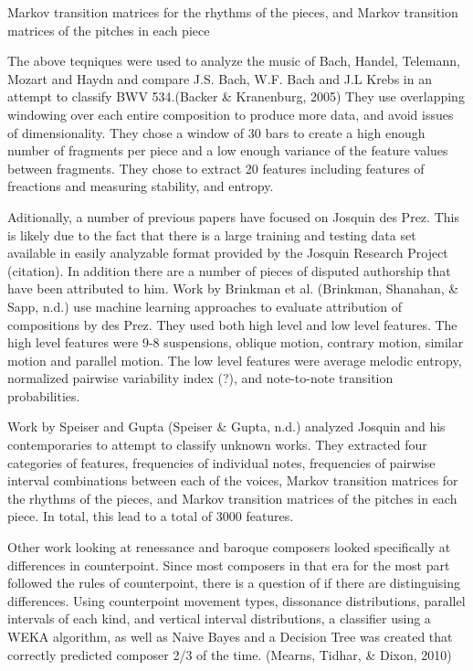 \documentclass[12pt,twoside]{reedthesis}
\theoremstyle{definition}
\theoremstyle{definition}
\theoremstyle{definition}
\theoremstyle{remark}
\begin{document}
Markov transition matrices for the rhythms of the pieces, and Markov
transition matrices of the pitches in each piece

The above teqniques were used to analyze the music of Bach, Handel,
Telemann, Mozart and Haydn and compare J.S. Bach, W.F. Bach and J.L
Krebs in an attempt to classify BWV 534.(Backer \& Kranenburg, 2005)
They use overlapping windowing over each entire composition to produce
more data, and avoid issues of dimensionality. They chose a window of 30
bars to create a high enough number of fragments per piece and a low
enough variance of the feature values between fragments. They chose to
extract 20 features including features of freactions and measuring
stability, and entropy.

Aditionally, a number of previous papers have focused on Josquin des
Prez. This is likely due to the fact that there is a large training and
testing data set available in easily analyzable format provided by the
Josquin Research Project (citation). In addition there are a number of
pieces of disputed authorship that have been attributed to him. Work by
Brinkman et al. (Brinkman, Shanahan, \& Sapp, n.d.) use machine learning
approaches to evaluate attribution of compositions by des Prez. They
used both high level and low level features. The high level features
were 9-8 suspensions, oblique motion, contrary motion, similar motion
and parallel motion. The low level features were average melodic
entropy, normalized pairwise variability index (?), and note-to-note
transition probabilities.

Work by Speiser and Gupta (Speiser \& Gupta, n.d.) analyzed Josquin and
his contemporaries to attempt to classify unknown works. They extracted
four categories of features, frequencies of individual notes,
frequencies of pairwise interval combinations between each of the
voices, Markov transition matrices for the rhythms of the pieces, and
Markov transition matrices of the pitches in each piece. In total, this
lead to a total of 3000 features.

Other work looking at renessance and baroque composers looked
specifically at differences in counterpoint. Since most composers in
that era for the most part followed the rules of counterpoint, there is
a question of if there are distinguising differences. Using counterpoint
movement types, dissonance distributions, parallel intervals of each
kind, and vertical interval distributions, a classifier using a WEKA
algorithm, as well as Naive Bayes and a Decision Tree was created that
correctly predicted composer 2/3 of the time. (Mearns, Tidhar, \& Dixon,
2010)
\end{document}
